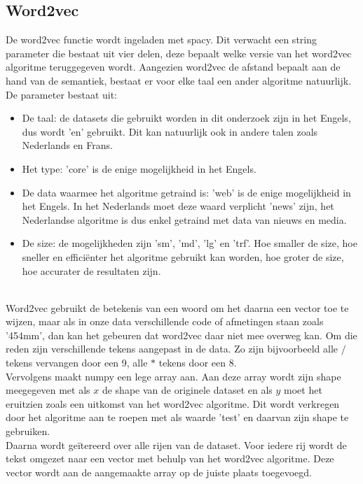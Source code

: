\subsection{Word2vec}
De word2vec functie wordt ingeladen met spacy. Dit verwacht een string parameter die bestaat uit vier delen, deze bepaalt welke versie van het word2vec algoritme teruggegeven wordt. Aangezien word2vec de afstand bepaalt aan de hand van de semantiek, bestaat er voor elke taal een ander algoritme natuurlijk. De parameter bestaat uit:
\\\indent
\begin{itemize}
    \item De taal: de datasets die gebruikt worden in dit onderzoek zijn in het Engels, dus wordt 'en' gebruikt. Dit kan natuurlijk ook in andere talen zoals Nederlands en Frans.
    \item Het type: 'core' is de enige mogelijkheid in het Engels.
    \item De data waarmee het algoritme getraind is: 'web' is de enige mogelijkheid in het Engels. In het Nederlands moet deze waard verplicht 'news' zijn, het Nederlandse algoritme is dus enkel getraind met data van nieuws en media.
    \item De size: de mogelijkheden zijn 'sm', 'md', 'lg' en 'trf'. Hoe smaller de size, hoe sneller en efficiënter het algoritme gebruikt kan worden, hoe groter de size, hoe accurater de resultaten zijn.
\end{itemize}
\\\indent
Word2vec gebruikt de betekenis van een woord om het daarna een vector toe te wijzen, maar als in onze data verschillende code of afmetingen staan zoals '454mm', dan kan het gebeuren dat word2vec daar niet mee overweg kan. Om die reden zijn verschillende tekens aangepast in de data. Zo zijn bijvoorbeeld alle $/$ tekens vervangen door een 9, alle $*$ tekens door een 8.
\\\indent
Vervolgens maakt numpy een lege array aan. Aan deze array wordt zijn shape meegegeven met als $x$ de shape van de originele dataset en als $y$ moet het eruitzien zoals een uitkomst van het word2vec algoritme. Dit wordt verkregen door het algoritme aan te roepen met als waarde 'test' en daarvan zijn shape te gebruiken.
\\\indent
Daarna wordt geïtereerd over alle rijen van de dataset. Voor iedere rij wordt de tekst omgezet naar een vector met behulp van het word2vec algoritme. Deze vector wordt aan de aangemaakte array op de juiste plaats toegevoegd.


